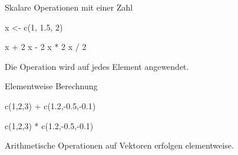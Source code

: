 \documentclass[
  10pt,
  ignorenonframetext,
  aspectratio=169,
]{beamer}
\newenvironment{Shaded}{}{}
\newcommand{\DecValTok}[1]{\textcolor[rgb]{0.25,0.63,0.44}{#1}}
\newcommand{\FloatTok}[1]{\textcolor[rgb]{0.25,0.63,0.44}{#1}}
\newcommand{\FunctionTok}[1]{\textcolor[rgb]{0.02,0.16,0.49}{#1}}
\newcommand{\NormalTok}[1]{#1}
\newcommand{\OtherTok}[1]{\textcolor[rgb]{0.00,0.44,0.13}{#1}}
\newcommand{\SpecialCharTok}[1]{\textcolor[rgb]{0.25,0.44,0.63}{#1}}
\begin{document}
\begin{frame}[fragile]{Skalare Operationen mit einer Zahl}
\label{skalare-operationen-mit-einer-zahl}
\begin{Shaded}
\begin{Highlighting}[]
\NormalTok{x }\OtherTok{\textless{}{-}} \FunctionTok{c}\NormalTok{(}\DecValTok{1}\NormalTok{, }\FloatTok{1.5}\NormalTok{, }\DecValTok{2}\NormalTok{)}

\NormalTok{x }\SpecialCharTok{+} \DecValTok{2}
\NormalTok{x }\SpecialCharTok{{-}} \DecValTok{2}
\NormalTok{x }\SpecialCharTok{*} \DecValTok{2}
\NormalTok{x }\SpecialCharTok{/} \DecValTok{2}
\end{Highlighting}
\end{Shaded}

Die Operation wird auf jedes Element angewendet.
\end{frame}

\begin{frame}[fragile]{Elementweise Berechnung}
\label{elementweise-berechnung}
\begin{Shaded}
\begin{Highlighting}[]
\FunctionTok{c}\NormalTok{(}\DecValTok{1}\NormalTok{,}\DecValTok{2}\NormalTok{,}\DecValTok{3}\NormalTok{) }\SpecialCharTok{+} \FunctionTok{c}\NormalTok{(}\FloatTok{1.2}\NormalTok{,}\SpecialCharTok{{-}}\FloatTok{0.5}\NormalTok{,}\SpecialCharTok{{-}}\FloatTok{0.1}\NormalTok{)}
\end{Highlighting}
\end{Shaded}

\begin{Shaded}
\begin{Highlighting}[]
\FunctionTok{c}\NormalTok{(}\DecValTok{1}\NormalTok{,}\DecValTok{2}\NormalTok{,}\DecValTok{3}\NormalTok{) }\SpecialCharTok{*} \FunctionTok{c}\NormalTok{(}\FloatTok{1.2}\NormalTok{,}\SpecialCharTok{{-}}\FloatTok{0.5}\NormalTok{,}\SpecialCharTok{{-}}\FloatTok{0.1}\NormalTok{)}
\end{Highlighting}
\end{Shaded}

Arithmetische Operationen auf Vektoren erfolgen elementweise.
\end{frame}
\end{document}
